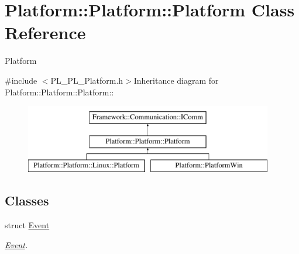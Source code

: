 \hypertarget{classPlatform_1_1Platform_1_1Platform}{
\section{Platform::Platform::Platform Class Reference}
\label{classPlatform_1_1Platform_1_1Platform}
}


Platform  


{\ttfamily \#include $<$PL\_\-PL\_\-Platform.h$>$}Inheritance diagram for Platform::Platform::Platform::\begin{figure}[H]
\begin{center}
\leavevmode
\includegraphics[height=3cm]{classPlatform_1_1Platform_1_1Platform}
\end{center}
\end{figure}
\subsection*{Classes}
\begin{DoxyCompactItemize}
\item 
struct \hyperlink{structPlatform_1_1Platform_1_1Platform_1_1Event}{Event}
\begin{DoxyCompactList}\small\item\em \hyperlink{structPlatform_1_1Platform_1_1Platform_1_1Event}{Event}. \item\end{DoxyCompactList}\end{DoxyCompactItemize}
